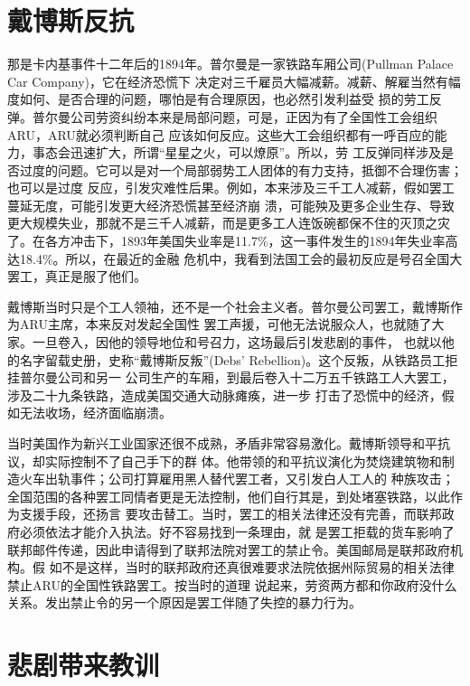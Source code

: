 \documentclass[10pt]{article}
\begin{document}
{\pagebreak
\section{戴博斯反抗}

那是卡内基事件十二年后的1894年。普尔曼是一家铁路车厢公司(Pullman Palace Car Company)，它在经济恐慌下
决定对三千雇员大幅减薪。减薪、解雇当然有幅度如何、是否合理的问题，哪怕是有合理原因，也必然引发利益受
损的劳工反弹。普尔曼公司劳资纠纷本来是局部问题，可是，正因为有了全国性工会组织ARU，ARU就必须判断自己
应该如何反应。这些大工会组织都有一呼百应的能力，事态会迅速扩大，所谓``星星之火，可以燎原''。所以，劳
工反弹同样涉及是否过度的问题。它可以是对一个局部弱势工人团体的有力支持，抵御不合理伤害；也可以是过度
反应，引发灾难性后果。例如，本来涉及三千工人减薪，假如罢工蔓延无度，可能引发更大经济恐慌甚至经济崩
溃，可能殃及更多企业生存、导致更大规模失业，那就不是三千人减薪，而是更多工人连饭碗都保不住的灭顶之灾
了。在各方冲击下，1893年美国失业率是11.7\%，这一事件发生的1894年失业率高达18.4\%。所以，在最近的金融
危机中，我看到法国工会的最初反应是号召全国大罢工，真正是服了他们。

戴博斯当时只是个工人领袖，还不是一个社会主义者。普尔曼公司罢工，戴博斯作为ARU主席，本来反对发起全国性
罢工声援，可他无法说服众人，也就随了大家。一旦卷入，因他的领导地位和号召力，这场最后引发悲剧的事件，
也就以他的名字留载史册，史称``戴博斯反叛''(Debs' Rebellion)。这个反叛，从铁路员工拒挂普尔曼公司和另一
公司生产的车厢，到最后卷入十二万五千铁路工人大罢工，涉及二十九条铁路，造成美国交通大动脉瘫痪，进一步
打击了恐慌中的经济，假如无法收场，经济面临崩溃。

当时美国作为新兴工业国家还很不成熟，矛盾非常容易激化。戴博斯领导和平抗议，却实际控制不了自己手下的群
体。他带领的和平抗议演化为焚烧建筑物和制造火车出轨事件；公司打算雇用黑人替代罢工者，又引发白人工人的
种族攻击；全国范围的各种罢工同情者更是无法控制，他们自行其是，到处堵塞铁路，以此作为支援手段，还扬言
要攻击替工。当时，罢工的相关法律还没有完善，而联邦政府必须依法才能介入执法。好不容易找到一条理由，就
是罢工拒载的货车影响了联邦邮件传递，因此申请得到了联邦法院对罢工的禁止令。美国邮局是联邦政府机构。假
如不是这样，当时的联邦政府还真很难要求法院依据州际贸易的相关法律禁止ARU的全国性铁路罢工。按当时的道理
说起来，劳资两方都和你政府没什么关系。发出禁止令的另一个原因是罢工伴随了失控的暴力行为。


\pagebreak
\section{悲剧带来教训}

}
\end{document}
